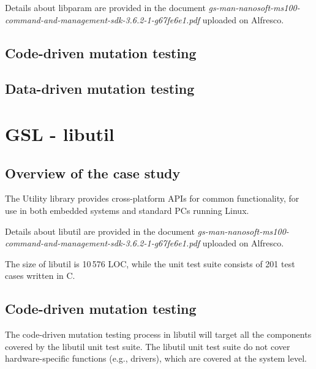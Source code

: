 Details about libparam are provided in the document \emph{gs-man-nanosoft-ms100-command-and-management-sdk-3.6.2-1-g67fe6e1.pdf} uploaded on Alfresco.

\subsection{Code-driven mutation testing}



\subsection{Data-driven mutation testing}



\section{GSL - libutil}
\label{sec:caseStudies:GSL:libutil}

\subsection{Overview of the case study}

The Utility library provides cross-platform APIs for common functionality, for use in both embedded systems and standard PCs running Linux. 

Details about libutil are provided in the document \emph{gs-man-nanosoft-ms100-command-and-management-sdk-3.6.2-1-g67fe6e1.pdf} uploaded on Alfresco.

The size of libutil is 10\,576 LOC, while the unit test suite consists of 201 test cases written in C.

\subsection{Code-driven mutation testing}


The code-driven mutation testing process in libutil will target all the components covered by the libutil unit test suite. 
The libutil unit test suite do not cover hardware-specific functions (e.g., drivers), which are covered at the system level.



